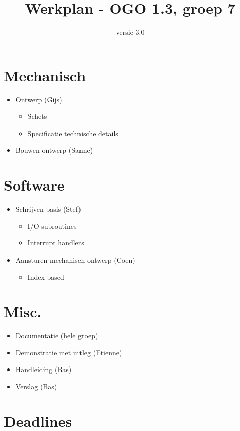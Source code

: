 \documentclass[]{article}
\title{Werkplan - OGO 1.3, groep 7 }
\date{versie 3.0}
\begin{document}
\maketitle


\section{Mechanisch }
  \begin{itemize}
    \item Ontwerp (Gijs)
    \begin{itemize}
        \item Schets
        \item Specificatie technische details
    \end{itemize}
    \item Bouwen ontwerp (Sanne)
  \end{itemize}

\section{Software}
  \begin{itemize}
    \item Schrijven basis (Stef)
    \begin{itemize}
        \item I/O subroutines
        \item Interrupt handlers
    \end{itemize}
    \item Aansturen mechanisch ontwerp (Coen)
    \begin{itemize}
        \item Index-based
    \end{itemize}
  \end{itemize}

\section{Misc.}
  \begin{itemize}
    \item Documentatie (hele groep)
    \item Demonstratie met uitleg (Etienne)
    \item Handleiding (Bas)
    \item Verslag (Bas)
  \end{itemize}

\section{Deadlines}
\end{document}
